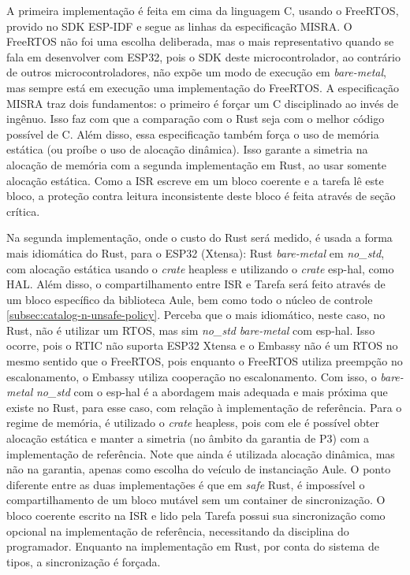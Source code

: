 A primeira implementação é feita em cima da linguagem C, usando o FreeRTOS, provido no \ac{SDK} ESP-IDF e segue as linhas da especificação \ac{MISRA}. O FreeRTOS não foi uma escolha deliberada, mas o mais representativo quando se fala em desenvolver com ESP32, pois o \ac{SDK} deste microcontrolador, ao contrário de outros microcontroladores, não expõe um modo de execução em \textit{bare-metal}, mas sempre está em execução uma implementação do FreeRTOS. A especificação \ac{MISRA} traz dois fundamentos: o primeiro é forçar um C disciplinado ao invés de ingênuo. Isso faz com que a comparação com o Rust seja com o melhor código possível de C. Além disso, essa especificação também força o uso de memória estática (ou proíbe o uso de alocação dinâmica). Isso garante a simetria na alocação de memória com a segunda implementação em Rust, ao usar somente alocação estática. Como a \ac{ISR} escreve em um bloco coerente e a tarefa lê este bloco, a proteção contra leitura inconsistente deste bloco é feita através de seção crítica.

Na segunda implementação, onde o custo do Rust será medido, é usada a forma mais idiomática do Rust, para o ESP32 (Xtensa): Rust \textit{bare-metal} em \textit{no\_std}, com alocação estática usando o \textit{crate} heapless e utilizando o \textit{crate} esp-hal, como \ac{HAL}. Além disso, o compartilhamento entre \ac{ISR} e Tarefa será feito através de um bloco específico da biblioteca Aule, bem como todo o núcleo de controle \ref{subsec:catalog-n-unsafe-policy}. Perceba que o mais idiomático, neste caso, no Rust, não é utilizar um \ac{RTOS}, mas sim \textit{no\_std} \textit{bare-metal} com esp-hal. Isso ocorre, pois o \ac{RTIC} não suporta ESP32 Xtensa e o Embassy não é um \ac{RTOS} no mesmo sentido que o FreeRTOS, pois enquanto o FreeRTOS utiliza preempção no escalonamento, o Embassy utiliza cooperação no escalonamento. Com isso, o \textit{bare-metal} \textit{no\_std} com o esp-hal é a abordagem mais adequada e mais próxima que existe no Rust, para esse caso, com relação à implementação de referência. Para o regime de memória, é utilizado o \textit{crate} heapless, pois com ele é possível obter alocação estática e manter a simetria (no âmbito da garantia de P3) com a implementação de referência. Note que ainda é utilizada alocação dinâmica, mas não na garantia, apenas como escolha do veículo de instanciação Aule. O ponto diferente entre as duas implementações é que em \textit{safe} Rust, é impossível o compartilhamento de um bloco mutável sem um container de sincronização. O bloco coerente escrito na \ac{ISR} e lido pela Tarefa possui sua sincronização como opcional na implementação de referência, necessitando da disciplina do programador. Enquanto na implementação em Rust, por conta do sistema de tipos, a sincronização é forçada.

